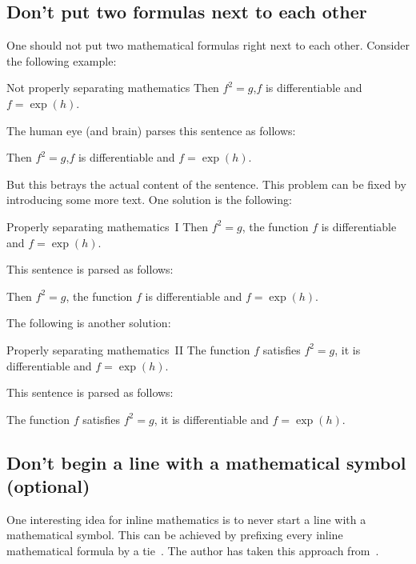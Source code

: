 \subsection{Don’t put two formulas next to each other}

One should not put two mathematical formulas right next to each other.
Consider the following example:
\begin{showlatex}{Not properly separating mathematics}
Then $f^2 = g$,$f$ is differentiable and $f = \exp(h)$.
\end{showlatex}
The human eye (and brain) parses this sentence as follows:
\begin{center}
  Then
  \quad
  $f^2 = g$,$f$
  \quad
  is differentiable and
  \quad
  $f = \exp(h)$.
\end{center}
But this betrays the actual content of the sentence.
This problem can be fixed by introducing some more text.
One solution is the following:
\begin{showlatex}{Properly separating mathematics~I}
Then $f^2 = g$, the function $f$ is differentiable and $f = \exp(h)$.
\end{showlatex}
This sentence is parsed as follows:
\begin{center}
  Then
  \quad
  $f^2 = g$,
  \quad
  the function
  \quad
  $f$
  \quad
  is differentiable and
  \quad
  $f = \exp(h)$.
\end{center}
The following is another solution:
\begin{showlatex}{Properly separating mathematics~II}
The function $f$ satisfies $f^2 = g$, it is differentiable and $f = \exp(h)$.
\end{showlatex}
This sentence is parsed as follows:
\begin{center}
  The function
  \quad
  $f$
  \quad
  satisfies
  \quad
  $f^2 = g$,
  \quad
  it is differentiable and
  \quad
  $f = \exp(h)$.
\end{center}



\subsection{Don’t begin a line with a mathematical symbol (optional)}

One interesting idea for inline mathematics is to never start a line with a mathematical symbol.
This can be achieved by prefixing every inline mathematical formula by a tie~\inlinecode{\customtexttilde}.
The author has taken this approach from~\cite{nomath_at_line}.





